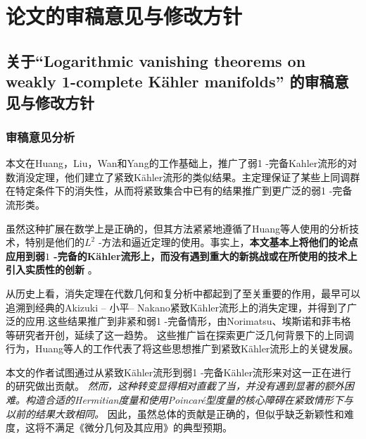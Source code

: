 \documentclass[lang=cn,zihao=-4,twoside,fontset=none]{textbook}
\begin{document}
\tableofcontents
\restoregeometry

\part{论文的审稿意见与修改方针}

\chapter[关于第一篇论文的审稿意见与见解探讨]{关于``Logarithmic vanishing theorems on weakly 1-complete K\"ahler manifolds'' 的审稿意见与修改方针}

\section{审稿意见分析}
 本文在Huang，Liu，Wan和Yang的工作基础上，推广了弱1 -完备Kahler流形的对数消没定理，他们建立了紧致K\"ahler流形的类似结果。主定理保证了某些上同调群在特定条件下的消失性，从而将紧致集合中已有的结果推广到更广泛的弱1 -完备流形类。


虽然这种扩展在数学上是正确的，但其方法紧紧地遵循了Huang等人使用的分析技术，特别是他们的$L^2$ -方法和逼近定理的使用。事实上，\textbf{本文基本上将他们的论点应用到弱$1$ -完备的K\"ahler流形上，而没有遇到重大的新挑战或在所使用的技术上引入实质性的创新} 。


从历史上看，消失定理在代数几何和复分析中都起到了至关重要的作用，最早可以追溯到经典的Akizuki -- 小平-- Nakano紧致K\"ahler流形上的消失定理，并得到了广泛的应用.这些结果推广到非紧和弱1 -完备情形，由Norimatsu、埃斯诺和菲韦格等研究者开创，延续了这一趋势。
这些推广旨在探索更广泛几何背景下的上同调行为，Huang等人的工作代表了将这些思想推广到紧致K\"ahler流形上的关键发展。

\softclearmargin
本文的作者试图通过从紧致K\"ahler流形到弱1 -完备K\"ahler流形来对这一正在进行的研究做出贡献。
\textit{然而，这种转变显得相对直截了当，并没有遇到显著的额外困难。构造合适的Hermitian度量和使用Poincar\'e型度量的核心障碍在紧致情形下与以前的结果大致相同。}  因此，虽然总体的贡献是正确的，但似乎缺乏新颖性和难度，这将不满足《微分几何及其应用》的典型预期。
\end{document}
